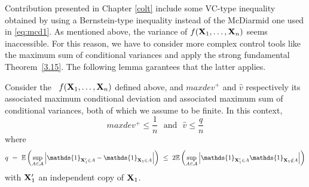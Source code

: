 Contribution presented in Chapter \ref{colt} include some VC-type inequality obtained by using a Bernstein-type inequality instead of the McDiarmid one used in \eqref{eq:mcd1}. As mentioned above, the variance of $f(\mathbf X_1,\ldots,\mathbf X_n)$ seems inaccessible. For this reason, we have to consider more complex control tools like the maximum sum of conditional variances and apply the strong fundamental Theorem~\ref{3.15}. The following lemma garantees that the latter applies.
\begin{lemma}
\label{back:lem-1}
Consider the \rv~$f(\mathbf X_1,\ldots,\mathbf X_n)$ defined above, and $maxdev^+$ and $\hat v$ respectively its associated maximum conditional deviation and associated maximum sum of conditional variances, both of which we assume to be finite. In this context,
$$maxdev^+ \le \frac{1}{n} \text{~~and~~} \hat v \le \frac{q}{n}$$ where 
\begin{align*}
q ~=~ \mathbb{E}\left ( \sup_{A \in \mathcal{A}} \left | \mathds{1}_{\mb X_1' \in A} - \mathds{1}_{\mb X_1 \in A} \right|\right) ~\le~ 2 \mathbb{E}\left ( \sup_{A \in \mathcal{A}} \left | \mathds{1}_{\mb X_1' \in A}  \mathds{1}_{\mb X_1 \notin A} \right|\right) 
\end{align*}
with $\mathbf X'_1$ an independent copy of $\mathbf X_1$.
\end{lemma}


